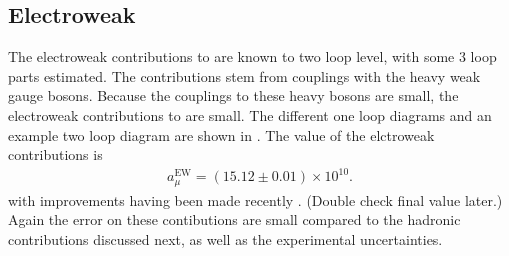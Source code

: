 \subsection{Electroweak}
\label{subsec:Electroweak}

The electroweak contributions to \amu are known to two loop level, with some 3 loop parts estimated. The contributions stem from couplings with the heavy weak gauge bosons. Because the couplings to these heavy bosons are small, the electroweak contributions to \amu are small. The different one loop diagrams and an example two loop diagram are shown in . The value of the elctroweak contributions is
		\begin{align}
            a_{\mu}^{\text{EW}} = (15.12 \pm 0.01) \times 10^{10}.
		\end{align}
with improvements having been made recently \cite{EW1,EW2}. (Double check final value later.) Again the error on these contibutions are small compared to the hadronic contributions discussed next, as well as the experimental uncertainties.


